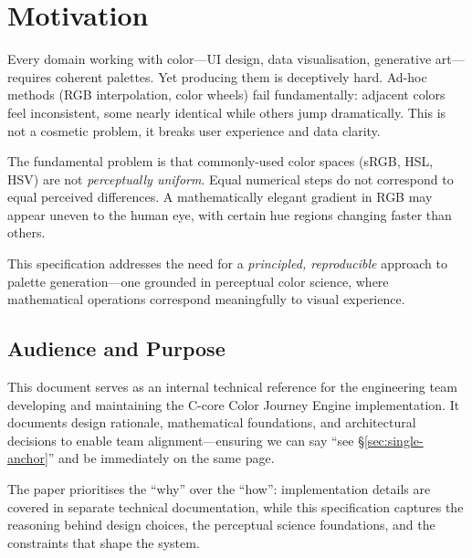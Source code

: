 
\section{Motivation}
\label{sec:motivation}

Every domain working with color—UI design, data visualisation, generative art—requires coherent palettes. Yet producing them is deceptively hard. Ad-hoc methods (RGB interpolation, color wheels) fail fundamentally: adjacent colors feel inconsistent, some nearly identical while others jump dramatically. This is not a cosmetic problem, it breaks user experience and data clarity.

The fundamental problem is that commonly-used color spaces (sRGB, HSL, HSV) are not \emph{perceptually uniform}. Equal numerical steps do not correspond to equal perceived differences. A mathematically elegant gradient in RGB may appear uneven to the human eye, with certain hue regions changing faster than others.

This specification addresses the need for a \emph{principled, reproducible} approach to palette generation---one grounded in perceptual color science, where mathematical operations correspond meaningfully to visual experience.

\subsection*{Audience and Purpose}

This document serves as an internal technical reference for the engineering team developing and maintaining the C-core Color Journey Engine implementation. It documents design rationale, mathematical foundations, and architectural decisions to enable team alignment---ensuring we can say ``see \S\ref{sec:single-anchor}'' and be immediately on the same page.

The paper prioritises the ``why'' over the ``how'': implementation details are covered in separate technical documentation, while this specification captures the reasoning behind design choices, the perceptual science foundations, and the constraints that shape the system.


